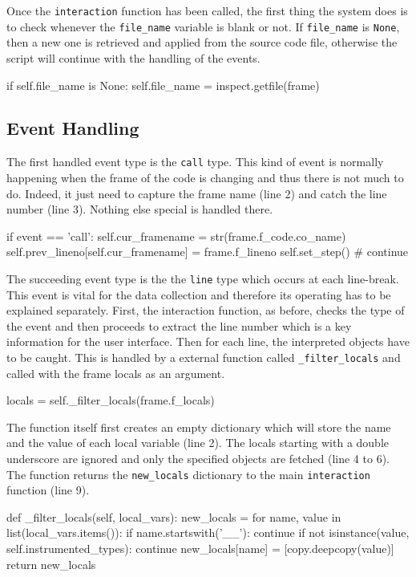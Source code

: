 Once the \texttt{interaction} function has been called, the first thing the system does is to check whenever the \texttt{file\_name} variable is blank or not. If \texttt{file\_name} is \texttt{None}, then a new one is retrieved and applied from the source code file, otherwise the script will continue with the handling of the events.
\begin{python}
if self.file_name is None:
    self.file_name = inspect.getfile(frame)
\end{python}

\subsection{Event Handling}
The first handled event type is the \texttt{call} type. This kind of event is normally happening when the frame of the code is changing and thus there is not much to do. Indeed, it just need to capture the frame name (line 2) and catch the line number (line 3). Nothing else special is handled there.
\begin{python}
if event == 'call':
    self.cur_framename = str(frame.f_code.co_name)
    self.prev_lineno[self.cur_framename] = frame.f_lineno
    self.set_step() # continue
\end{python}

The succeeding event type is the the \texttt{line} type which occurs at each line-break. This event is vital for the data collection and therefore its operating has to be explained separately. First, the interaction function, as before, checks the type of the event and then proceeds to extract the line number which is a key information for the user interface. Then for each line, the interpreted objects have to be caught. This is handled by a external function called \texttt{\_filter\_locals} and called with the frame locals as an argument.
\begin{python}
locals = self._filter_locals(frame.f_locals)
\end{python}

The function itself first creates an empty dictionary which will store the name and the value of each local variable (line 2). The locals starting with a double underscore are ignored and only the specified objects are fetched (line 4 to 6). The function returns the \texttt{new\_locals} dictionary to the main \texttt{interaction} function (line 9).

\begin{python}
def _filter_locals(self, local_vars):
    new_locals = {}
    for name, value in list(local_vars.items()):
        if name.startswith('__'):
            continue
        if not isinstance(value, self.instrumented_types):
            continue
        new_locals[name] = [copy.deepcopy(value)]
    return new_locals

\end{python}

